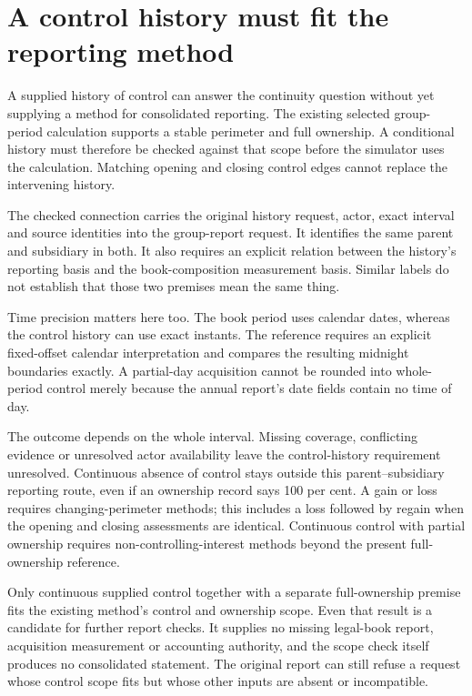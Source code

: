 \section{A control history must fit the reporting method}
\label{sim:control-group-scope}

A supplied history of control can answer the continuity question without yet supplying a method for consolidated reporting. The existing selected group-period calculation supports a stable perimeter and full ownership. A conditional history must therefore be checked against that scope before the simulator uses the calculation. Matching opening and closing control edges cannot replace the intervening history.

The checked connection carries the original history request, actor, exact interval and source identities into the group-report request. It identifies the same parent and subsidiary in both. It also requires an explicit relation between the history's reporting basis and the book-composition measurement basis. Similar labels do not establish that those two premises mean the same thing.

Time precision matters here too. The book period uses calendar dates, whereas the control history can use exact instants. The reference requires an explicit fixed-offset calendar interpretation and compares the resulting midnight boundaries exactly. A partial-day acquisition cannot be rounded into whole-period control merely because the annual report's date fields contain no time of day.

The outcome depends on the whole interval. Missing coverage, conflicting evidence or unresolved actor availability leave the control-history requirement unresolved. Continuous absence of control stays outside this parent--subsidiary reporting route, even if an ownership record says 100 per cent. A gain or loss requires changing-perimeter methods; this includes a loss followed by regain when the opening and closing assessments are identical. Continuous control with partial ownership requires non-controlling-interest methods beyond the present full-ownership reference.

Only continuous supplied control together with a separate full-ownership premise fits the existing method's control and ownership scope. Even that result is a candidate for further report checks. It supplies no missing legal-book report, acquisition measurement or accounting authority, and the scope check itself produces no consolidated statement. The original report can still refuse a request whose control scope fits but whose other inputs are absent or incompatible.

